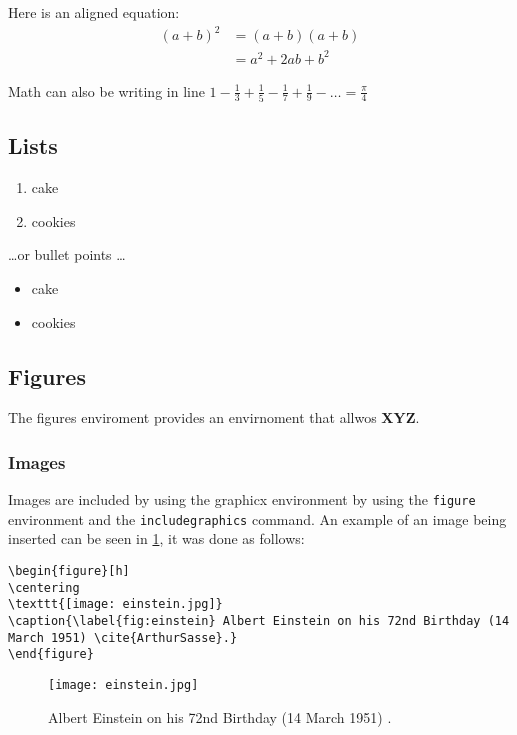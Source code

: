 \documentclass[11pt,a4paper,titlepage]{article}
\begin{document}
Here is an aligned equation:
\begin{align}
(a+b)^2  & = (a+b)(a+b)  \nonumber \\
  & = a^2+2ab+b^2 \label{eq:aplusbexpanded}
\end{align}


Math can also be writing in line $1-\frac{1}{3}+\frac{1}{5}-\frac{1}{7}+\frac{1}{9}-\ldots = \frac{\pi}{4}$

\subsection{Lists}

\begin{enumerate}
\item cake
\item cookies
\end{enumerate}

\dots or bullet points \dots

\begin{itemize}
\item cake
\item cookies
\end{itemize}


\subsection{Figures}
The figures enviroment provides an envirnoment that allwos \textbf{XYZ}.
\subsubsection{Images}

Images are included by using the graphicx environment by using the \texttt{figure} environment and the \texttt{includegraphics} command. An example of an image being inserted can be seen in \ref{fig:einstein}, it was done as follows:

\begin{lstlisting}[breaklines]
\begin{figure}[h]
\centering
\texttt{[image: einstein.jpg]}
\caption{\label{fig:einstein} Albert Einstein on his 72nd Birthday (14 March 1951) \cite{ArthurSasse}.}
\end{figure}
\end{lstlisting}

\begin{figure}[h]
\centering
\texttt{[image: einstein.jpg]}
\caption{\label{fig:einstein} Albert Einstein on his 72nd Birthday (14 March 1951) \cite{ArthurSasse}.}
\end{figure}
\end{document}
